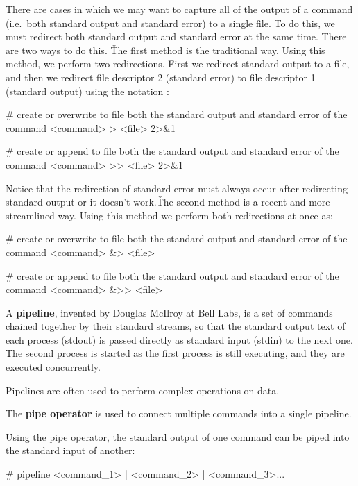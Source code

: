 There are cases in which we may want to capture all of the output of a command (i.e.\ both standard output and
standard error) to a single file. To do this, we must redirect both standard output and standard error at the same
time. There are two ways to do this. \v

The first method is the traditional way. Using this method, we perform two redirections. First we redirect standard
output to a file, and then we redirect file descriptor 2 (standard error) to file descriptor 1 (standard output)
using the notation :
\begin{bash}
# create or overwrite to file both the standard output and standard error of the command
<command> > <file> 2>&1
\end{bash}

\begin{bash}
# create or append to file both the standard output and standard error of the command
<command> >> <file> 2>&1
\end{bash}

Notice that the redirection of standard error must always occur after redirecting standard output or it doesn't work.\v

The second method is a recent and more streamlined way. Using this method we perform both redirections at once as:
\begin{bash}
# create or overwrite to file both the standard output and standard error of the command
<command> &> <file>
\end{bash}

\begin{bash}
# create or append to file both the standard output and standard error of the command
<command> &>> <file>
\end{bash}

\bd[Pipeline]
A \textbf{pipeline}, invented by Douglas McIlroy at Bell Labs, is a set of commands chained together by their standard
streams, so that the standard output text of each process (stdout) is passed directly as standard input (stdin) to the
next one. The second process is started as the first process is still executing, and they are executed concurrently.
\ed

Pipelines are often used to perform complex operations on data.

The \textbf{pipe operator} \code{|} is used to connect multiple commands into a single pipeline.
\ed

Using the pipe operator, the standard output of one command can be piped into the standard input of another:
\begin{bash}
# pipeline
<command_1> | <command_2> | <command_3>...
\end{bash}


